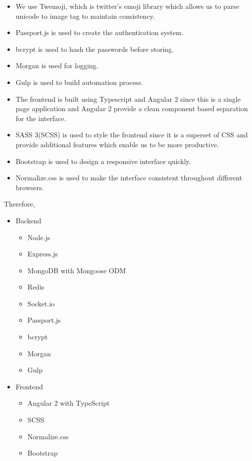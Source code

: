 \documentclass{scrreprt}
\begin{document}
\begin{itemize}
  \item We use Twemoji, which is twitter's emoji library which allows us to
  parse unicode to image tag to maintain consistency.

  \item Passport.js is used to create the authentication system.

  \item bcrypt is used to hash the passwords before storing.

  \item Morgan is used for logging.

  \item Gulp is used to build automation process.

  \item The frontend is built using Typescript and Angular 2 since this is a
  single page application and Angular 2 provide a clean component based separation
  for the interface.

  \item SASS 3(SCSS) is used to style the frontend since it is a superset of CSS
  and provide additional features which enable us to be more productive.

   \item Bootstrap is used to design a responsive interface quickly.

   \item Normalize.css is used to make the interface consistent throughout
   different browsers.

\end{itemize}

Therefore,
  \begin{itemize}
    \item Backend
      \begin{itemize}
        \item Node.js
        \item Express.js
        \item MongoDB with Mongoose ODM
        \item Redis
        \item Socket.io
        \item Passport.js
        \item bcrypt
        \item Morgan
        \item Gulp
      \end{itemize}

    \item Frontend
      \begin{itemize}
      \item Angular 2 with TypeScript
      \item SCSS
      \item Normalize.css
      \item Bootstrap
      \end{itemize}
  \end{itemize}
\end{document}

